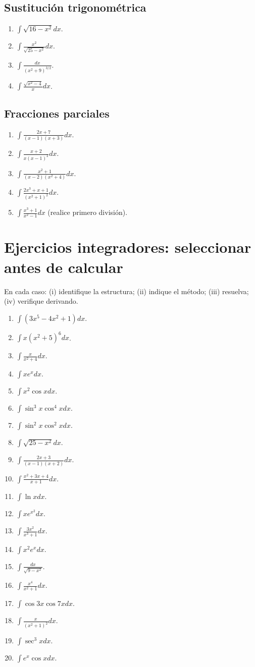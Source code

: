 \documentclass[12pt]{article}
\theoremstyle{definition}\newtheorem{definicion}[teorema]{Definición}\newtheorem{ejemplo}[teorema]{Ejemplo}\newtheorem{ejercicio}[teorema]{Ejercicio}
\theoremstyle{remark}\newtheorem*{observacion}{Observación}\newtheorem*{advertencia}{Advertencia}\newtheorem*{estrategia}{Estrategia}
\begin{document}
\subsection*{Sustitución trigonométrica}
\begin{enumerate}
\item $\int\sqrt{16-x^2}dx$.
\item $\int\frac{x^2}{\sqrt{25-x^2}}dx$.
\item $\int\frac{dx}{(x^2+9)^{3/2}}$.
\item $\int\frac{\sqrt{x^2-4}}{x}dx$.
\end{enumerate}
\subsection*{Fracciones parciales}
\begin{enumerate}
\item $\int\frac{2x+7}{(x-1)(x+3)}dx$.
\item $\int\frac{x+2}{x(x-1)^2}dx$.
\item $\int\frac{x^2+1}{(x-2)(x^2+4)}dx$.
\item $\int\frac{2x^3+x+1}{(x^2+1)^2}dx$.
\item $\int\frac{x^3+1}{x^2-1}dx$ (realice primero división).
\end{enumerate}

\section{Ejercicios integradores: seleccionar antes de calcular}
En cada caso: (i) identifique la estructura; (ii) indique el método; (iii) resuelva; (iv) verifique derivando.
\begin{enumerate}
\item $\int(3x^5-4x^2+1)dx$.
\item $\int x(x^2+5)^6dx$.
\item $\int\frac{x}{x^2+4}dx$.
\item $\int xe^xdx$.
\item $\int x^2\cos xdx$.
\item $\int\sin^3x\cos^4xdx$.
\item $\int\sin^2x\cos^2xdx$.
\item $\int\sqrt{25-x^2}dx$.
\item $\int\frac{2x+3}{(x-1)(x+2)}dx$.
\item $\int\frac{x^2+3x+4}{x+1}dx$.
\item $\int\ln xdx$.
\item $\int xe^{x^2}dx$.
\item $\int\frac{3x^2}{x^3+1}dx$.
\item $\int x^2e^xdx$.
\item $\int\frac{dx}{\sqrt{9-x^2}}$.
\item $\int\frac{x^4}{x^2+1}dx$.
\item $\int\cos3x\cos7xdx$.
\item $\int\frac{x}{(x^2+1)^2}dx$.
\item $\int\sec^3x dx$.
\item $\int e^x\cos xdx$.
\end{enumerate}
\end{document}
